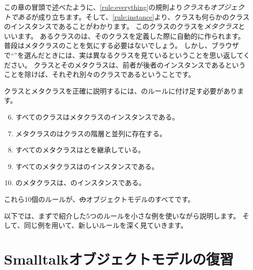 \documentclass[a4paper,10pt,twoside]{book}
\begin{document}
この章の冒頭で述べたように、\ref{rule:everything}の規則より\emph{クラスもオブジェクトである}が成り立ちます。そして、\ref{rule:instance}より、クラスも何らかのクラスのインスタンスであることがわかります。
このクラスのクラスを\emph{メタクラス}といいます。
あるクラスのは、そのクラスを定義した際に自動的に作られます。
普段はメタクラスのことを気にする必要はないでしょう。
しかし、ブラウザで``''を選んだときには、実は異なるクラスを見ているということを思い返してください。
クラスとそのメタクラスは、前者が後者のインスタンスであるということを除けば、それぞれ別々のクラスであるということです。

クラスとメタクラスを正確に説明するには、のルールに付け足す必要があります。

\begin{enumerate}[label={\textbf{Rule \arabic{*}}.}, ref={Rule \arabic{*}}, leftmargin=*, widest=10]
\setcounter{enumi}{5}
\item{} 
	すべてのクラスはメタクラスのインスタンスである。

\item{} 
	メタクラスのはクラスの階層と並列に存在する。

\item{} 
	すべてのメタクラスはとを継承している。

\item{} 
	すべてのメタクラスはのインスタンスである。

\item{} 
	のメタクラスは、のインスタンスである。

\end{enumerate}

\noindent
これら10個のルールが、\st のオブジェクトモデルのすべてです。

以下では、まずで紹介した5つのルールを小さな例を使いながら説明します。
そして、同じ例を用いて、新しいルールを深く見ていきます。

\section{Smalltalkオブジェクトモデルの復習}
\end{document}
